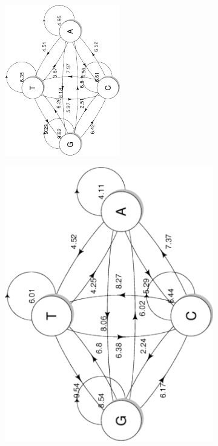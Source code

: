 \documentclass{article}
\begin{document}
\begin{figure}
   \centering
   \begin{subfigure}{.5\textwidth}
      \centering
      \includegraphics[width=.7\textwidth,natwidth=100,natheight=100,angle=270]{hg38.pdf}
      \caption{}
      \label{fig:blah1}
   \end{subfigure}%
   \begin{subfigure}{.5\textwidth}
      \centering
      \includegraphics[width=.7\textwidth,natwidth=100,natheight=100,angle=270]{mm10.pdf}

\end{subfigure}
\end{figure}
\end{document}
